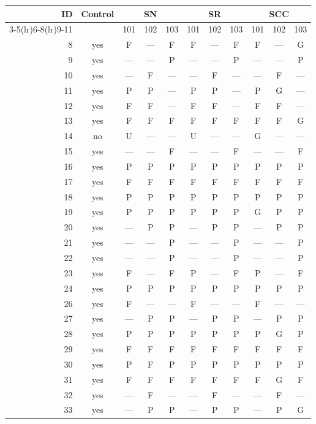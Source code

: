 \begin{table}[p]\centering\small
\begin{tabular*}{\textwidth}{@{\extracolsep{\fill}}rc*{9}{c}@{}}\toprule
ID & Control & \multicolumn{3}{c}{SN} & \multicolumn{3}{c}{SR} & \multicolumn{3}{c}{SCC}\\
\cmidrule(lr){3-5}\cmidrule(lr){6-8}\cmidrule(lr){9-11}
 & & 101 & 102 & 103 & 101 & 102 & 103 & 101 & 102 & 103\\\midrule
8 & yes & F & — & F & F & — & F & F & — & G\\
9 & yes & — & — & P & — & — & P & — & — & P\\
10 & yes & — & F & — & — & F & — & — & F & —\\
11 & yes & P & P & — & P & P & — & P & G & —\\
12 & yes & F & F & — & F & F & — & F & F & —\\
13 & yes & F & F & F & F & F & F & F & F & G\\
14 & no & U & — & — & U & — & — & G & — & —\\
15 & yes & — & — & F & — & — & F & — & — & F\\
16 & yes & P & P & P & P & P & P & P & P & P\\
17 & yes & F & F & F & F & F & F & F & F & F\\
18 & yes & P & P & P & P & P & P & P & P & P\\
19 & yes & P & P & P & P & P & P & G & P & P\\
20 & yes & — & P & P & — & P & P & — & P & P\\
21 & yes & — & — & P & — & — & P & — & — & P\\
22 & yes & — & — & P & — & — & P & — & — & P\\
23 & yes & F & — & F & P & — & F & P & — & F\\
24 & yes & P & P & P & P & P & P & P & P & P\\
26 & yes & F & — & — & F & — & — & F & — & —\\
27 & yes & — & P & P & — & P & P & — & P & P\\
28 & yes & P & P & P & P & P & P & P & G & P\\
29 & yes & F & F & F & F & F & F & F & F & F\\
30 & yes & P & F & P & P & P & P & P & P & P\\
31 & yes & F & F & F & F & F & F & F & G & F\\
32 & yes & — & F & — & — & F & — & — & F & —\\
33 & yes & — & P & P & — & P & P & — & P & G\\

\end{tabular*}
\end{table}
